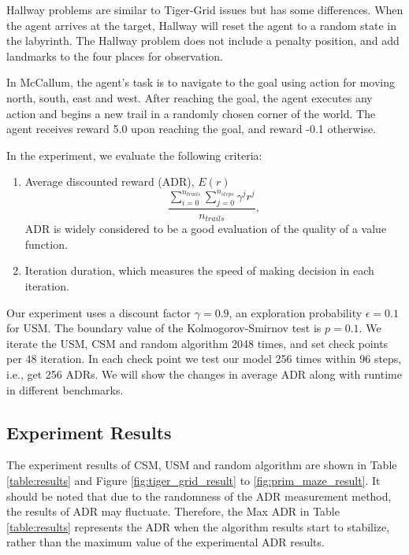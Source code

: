 \documentclass{article}
\begin{document}
Hallway problems are similar to Tiger-Grid issues but has some differences. When the agent
arrives at the target, Hallway will reset the agent to a random state in the labyrinth.
The Hallway problem does not include a penalty position, and add landmarks to the four places
for observation.

In McCallum, the agent’s task is to navigate to the goal using action for moving north,
south, east and west. After reaching the goal, the agent executes any action and begins a new
trail in a randomly chosen corner of the world. The agent receives reward 5.0 upon reaching
the goal, and reward -0.1 otherwise.



In the experiment, we evaluate the following criteria:

\begin{enumerate}
  \item Average discounted reward (ADR), $E(r)$
  \begin{equation}
    \frac{\sum_{i=0}^{n_{trails}} \sum_{j=0}^{n_{steps}} \gamma^j r^j}{n_{trails}},
  \end{equation}
  ADR is widely considered to be a good evaluation of the quality of a value function.
  
  \item Iteration duration, which measures the speed of making decision in each iteration.
\end{enumerate}

Our experiment uses a discount factor $\gamma=0.9$, an exploration probability $\epsilon=0.1$ for USM.
The boundary value of the Kolmogorov-Smirnov test is $p=0.1$. We iterate the USM, CSM and random algorithm
2048 times, and set check points per 48 iteration. In each check point we test our model 256 times
within 96 steps, i.e., get 256 ADRs. We will show the changes in average ADR along with runtime in
different benchmarks.

\subsection{Experiment Results}

The experiment results of CSM, USM and random algorithm are shown in  Table \ref{table:results} and Figure  \ref{fig:tiger_grid_result} to \ref{fig:prim_maze_result}. It should be noted that due to the randomness of the ADR measurement method, the results of ADR may fluctuate. Therefore, the Max ADR in Table \ref{table:results}  represents the ADR when the algorithm results start to stabilize, rather than the maximum value of the experimental ADR results.
\end{document}
